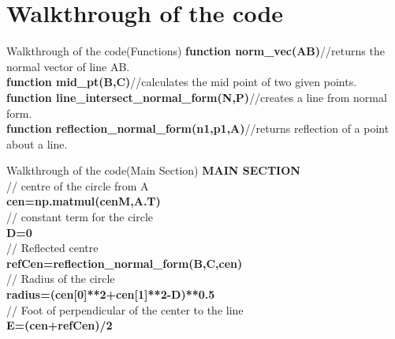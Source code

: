 \documentclass{beamer}
\begin{document}
\section{ Walkthrough of the code }

\begin{frame}{Walkthrough of the code(Functions)}
\textbf{function norm\_vec(AB)}\hfill //returns the normal vector of line AB.\\
\textbf{function mid\_pt(B,C)}\hfill //calculates the mid point of two given points.\\
\textbf{function line\_intersect\_normal\_form(N,P)}\hfill //creates a line from normal form.\\
\textbf{function reflection\_normal\_form(n1,p1,A)}\hfill //returns reflection of a point about a line.\\
\end{frame}

\begin{frame}{Walkthrough of the code(Main Section)}
\textbf{MAIN SECTION}\\
// centre of the circle from A\\
\textbf{cen=np.matmul(cenM,A.T)} \\

// constant term for the circle \\
\textbf{D=0} \\

// Reflected centre \\
\textbf{refCen=reflection\_normal\_form(B,C,cen)} \\

// Radius of the circle \\
\textbf{radius=(cen[0]**2+cen[1]**2-D)**0.5} \\

// Foot of perpendicular of the center to the line \\
\textbf{E=(cen+refCen)/2} \\
\end{frame}

 
\end{document}
